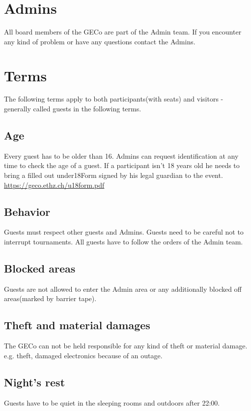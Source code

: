 \documentclass{article}
\begin{document}
\section{Admins}
All board members of the GECo are part of the Admin team. If you encounter any kind of problem or have any questions contact the Admins.

\section{Terms}
The following terms apply to both participants(with seats) and visitors - generally called guests in the following terms.

\subsection{Age}
Every guest has to be older than 16. Admins can request identification at any time to check the age of a guest.
If a participant isn't 18 years old he needs to bring a filled out under18Form signed by his legal guardian to the event. \url{https://geco.ethz.ch/u18form.pdf}

\subsection{Behavior}
Guests must respect other guests and Admins. Guests need to be careful not to interrupt tournaments. All guests have to follow the orders of the Admin team.

\subsection{Blocked areas}
Guests are not allowed to enter the Admin area or any additionally blocked off areas(marked by barrier tape).

\subsection{Theft and material damages}
The GECo can not be held responsible for any kind of theft or material damage.\\ 
e.g. theft, damaged electronics because of an outage.

\subsection{Night's rest} 
Guests have to be quiet in the sleeping rooms and outdoors after 22:00.
\end{document}
